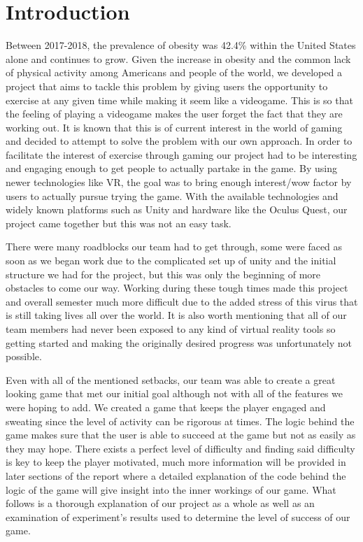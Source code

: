 \documentclass{sigchi}
\def\plainkeywords{Virtual reality; physical activity; heart rate; oculus quest}
\begin{document}

\keywords{\plainkeywords}

\printccsdesc

\section{Introduction}
Between 2017-2018, the prevalence of obesity was 42.4\% within the United States alone and continues to grow.\cite{CDC_2020} Given the increase in obesity and the common lack of physical activity among Americans and people of the world, we developed a project that aims to tackle this problem by giving users the opportunity to exercise at any given time while making it seem like a videogame. This is so that the feeling of playing a videogame makes the user forget the fact that they are working out. It is known that this is of current interest in the world of gaming and decided to attempt to solve the problem with our own approach\cite{mcclure_schofield}. In order to facilitate the interest of exercise through gaming our project had to be interesting and engaging enough to get people to actually partake in the game. By using newer technologies like VR, the goal was to bring enough interest/wow factor by users to actually pursue trying the game. With the available technologies and widely known platforms such as Unity and hardware like the Oculus Quest, our project came together but this was not an easy task. 

There were many roadblocks our team had to get through, some were faced as soon as we began work due to the complicated set up of unity and the initial structure we had for the project, but this was only the beginning of more obstacles to come our way. Working during these tough times made this project and overall semester much more difficult due to the added stress of this virus that is still taking lives all over the world. It is also worth mentioning that all of our team members had never been exposed to any kind of virtual reality tools so getting started and making the originally desired progress was unfortunately not possible. 

Even with all of the mentioned setbacks, our team was able to create a great looking game that met our initial goal although not with all of the features we were hoping to add. We created a game that keeps the player engaged and sweating since the level of activity can be rigorous at times. The logic behind the game makes sure that the user is able to succeed at the game but not as easily as they may hope. There exists a perfect level of difficulty and finding said difficulty is key to keep the player motivated, much more information will be provided in later sections of the report where a detailed explanation of the code behind the logic of the game will give insight into the inner workings of our game. What follows is a thorough explanation of our project as a whole as well as an examination of experiment’s results used to determine the level of success of our game. 
\end{document}
